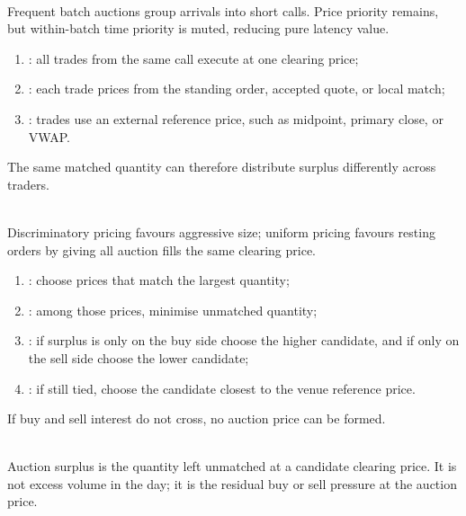 \documentclass[a4paper,oneside,openany]{book}
\begin{document}
\begin{mechanism} \\
Frequent batch auctions group arrivals into short calls. Price priority remains, but within-batch time priority is muted, reducing pure latency value.
\end{mechanism}

\begin{taxonomy} 
\begin{enumerate}[label=\roman*.]
\setlength{\itemsep}{0pt}
\item {}: all trades from the same call execute at one clearing price;
\item {}: each trade prices from the standing order, accepted quote, or local match;
\item {}: trades use an external reference price, such as midpoint, primary close, or VWAP.
\end{enumerate}
The same matched quantity can therefore distribute surplus differently across traders.
\end{taxonomy}

\begin{principle} \\
Discriminatory pricing favours aggressive size; uniform pricing favours resting orders by giving all auction fills the same clearing price.
\end{principle}

\begin{process} 
\begin{enumerate}[label=\roman*.]
\setlength{\itemsep}{0pt}
\item {}: choose prices that match the largest quantity;
\item {}: among those prices, minimise unmatched quantity;
\item {}: if surplus is only on the buy side choose the higher candidate, and if only on the sell side choose the lower candidate;
\item {}: if still tied, choose the candidate closest to the venue reference price.
\end{enumerate}
If buy and sell interest do not cross, no auction price can be formed.
\end{process}

\begin{definition} \\
Auction surplus is the quantity left unmatched at a candidate clearing price. It is not excess volume in the day; it is the residual buy or sell pressure at the auction price.
\end{definition}
\end{document}

